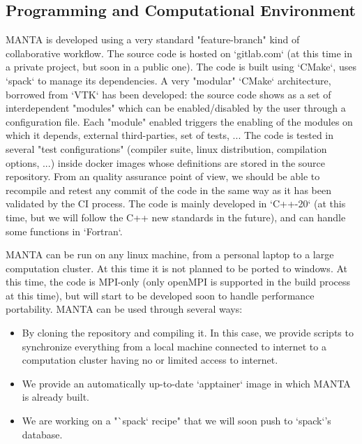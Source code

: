 \subsection{Programming and Computational Environment}
\label{sec::MANTA:environment_capabilities}

MANTA is developed using a very standard "feature-branch" kind of collaborative workflow. The source code is hosted on `gitlab.com` (at this time in a private project, but soon in a public one). The code is built using `CMake`, uses `spack` to manage its dependencies. A very "modular" `CMake` architecture, borrowed from `VTK` has been developed: the source code shows as a set of interdependent "modules" which can be enabled/disabled by the user through a configuration file. Each "module" enabled triggers the enabling of the modules on which it depends, external third-parties, set of tests, ... The code is tested in several "test configurations" (compiler suite, linux distribution, compilation options, ...) inside docker images whose definitions are stored in the source repository. From an quality assurance point of view, we should be able to recompile and retest any commit of the code in the same way as it has been validated by the CI process. The code is mainly developed in `C++-20` (at this time, but we will follow the C++ new standards in the future), and can handle some functions in `Fortran`.

MANTA can be run on any linux machine, from a personal laptop to a large computation cluster. At this time it is not planned to be ported to windows. At this time, the code is MPI-only (only openMPI is supported in the build process at this time), but will start to be developed soon to handle performance portability. MANTA can be used through several ways:
\begin{itemize}
    \item By cloning the repository and compiling it. In this case, we provide scripts to synchronize everything from a local machine connected to internet to a computation cluster having no or limited access to internet.
    \item We provide an automatically up-to-date `apptainer` image in which MANTA is already built.
    \item We are working on a "`spack` recipe" that we will soon push to `spack`'s database.
\end{itemize}

